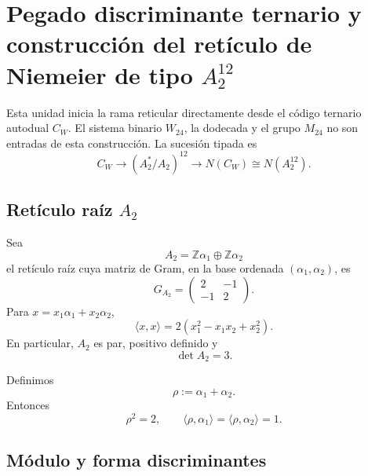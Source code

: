 
\section{Pegado discriminante ternario y construcción del retículo de Niemeier de tipo \texorpdfstring{\(A_2^{12}\)}{A₂¹²}}
\label{p12-83-c20-s4:chap:pegado-niemeier-a2-doce}

Esta unidad inicia la rama reticular directamente desde el código ternario
autodual \(C_W\). El sistema binario \(W_{24}\), la dodecada y el grupo
\(M_{24}\) no son entradas de esta construcción. La sucesión tipada es
\[
 C_W
 \longrightarrow
 (A_2^*/A_2)^{12}
 \longrightarrow
 N(C_W)
 \cong N(A_2^{12}).
\]

\subsection{Retículo raíz \texorpdfstring{\(A_2\)}{A₂}}

Sea
\[
 A_2=\mathbb Z\alpha_1\oplus\mathbb Z\alpha_2
\]
el retículo raíz cuya matriz de Gram, en la base ordenada
\((\alpha_1,\alpha_2)\), es
\begin{equation}
 G_{A_2}=
 \begin{pmatrix}
 2&-1\\
 -1&2
 \end{pmatrix}.
 \label{p12-83-c20-s4:eq:gram-a2-autonomo}
\end{equation}
Para \(x=x_1\alpha_1+x_2\alpha_2\),
\begin{equation}
 \langle x,x\rangle
 =2(x_1^2-x_1x_2+x_2^2).
 \label{p12-83-c20-s4:eq:norma-a2-autonoma}
\end{equation}
En particular, \(A_2\) es par, positivo definido y
\[
 \det A_2=3.
\]

Definimos
\[
 \rho:=\alpha_1+\alpha_2.
\]
Entonces
\begin{equation}
 \rho^2=2,
 \qquad
 \langle\rho,\alpha_1\rangle
 =\langle\rho,\alpha_2\rangle=1.
 \label{p12-83-c20-s4:eq:identidades-rho-a2}
\end{equation}

\subsection{Módulo y forma discriminantes}

